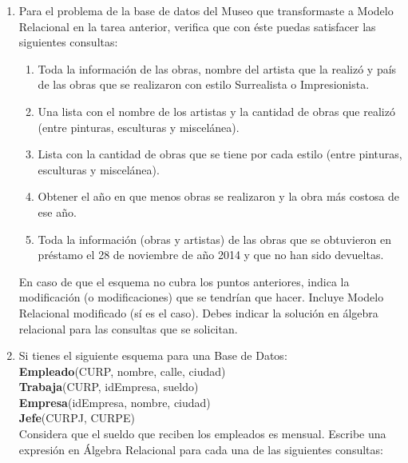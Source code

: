 \documentclass{article}
\author{Flores González Luis Brandon - 312218342 \\ García Argueta Jaime Daniel - 312104739 \\ Tarea 4. Algebra relacional}
\title{}
\date{29 de marzo de 2017}
\begin{document}
	\maketitle	
	
	\begin{enumerate}
		\item Para el problema de la base de datos del Museo que transformaste a Modelo Relacional
		en la tarea anterior, verifica que con éste puedas satisfacer las siguientes consultas:
			\begin{enumerate}
				\item Toda la información de las obras, nombre del artista que la realizó y país de las obras que se
				realizaron con estilo Surrealista o Impresionista.
				
				\item Una lista con el nombre de los artistas y la cantidad de obras que realizó (entre pinturas,
				esculturas y miscelánea).
						
				\item Lista con la cantidad de obras que se tiene por cada estilo (entre pinturas, esculturas y
				miscelánea).
										
				\item Obtener el año en que menos obras se realizaron y la obra más costosa de ese año.
				
				\item Toda la información (obras y artistas) de las obras que se obtuvieron en préstamo el 28 de
				noviembre de año 2014 y que no han sido devueltas.
			\end{enumerate}
		En caso de que el esquema no cubra los puntos anteriores, indica la modificación (o
		modificaciones) que se tendrían que hacer. Incluye Modelo Relacional modificado (sí es el caso).
		Debes indicar la solución en álgebra relacional para las consultas que se solicitan.
		\item Si tienes el siguiente esquema para una Base de Datos:\\

		\textbf{Empleado}(CURP, nombre, calle, ciudad)\\
		\textbf{Trabaja}(CURP, idEmpresa, sueldo)\\
		\textbf{Empresa}(idEmpresa, nombre, ciudad)\\
		\textbf{Jefe}(CURPJ, CURPE)\\
		
		Considera que el sueldo que reciben los empleados es mensual. Escribe una expresión en Álgebra Relacional para cada una de las siguientes consultas:
		

\end{enumerate}
\end{document}
